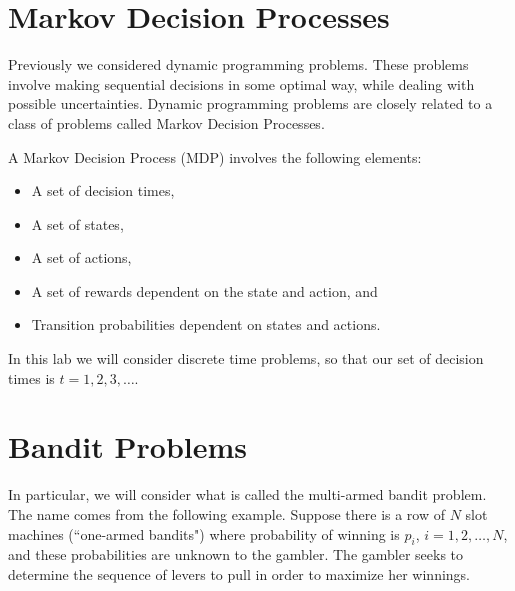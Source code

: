 
\section*{Markov Decision Processes}
Previously we considered dynamic programming problems.
These problems involve making sequential decisions in some optimal way,
while dealing with possible uncertainties.  Dynamic programming problems are closely
related to a class of problems called Markov Decision Processes.

A Markov Decision Process (MDP) involves the following elements:

\begin{itemize}
\item   A set of decision times,
\item   A set of states,
\item   A set of actions,
\item   A set of rewards dependent on the state and action, and
\item   Transition probabilities dependent on states and actions.
\end{itemize}
In this lab we will consider discrete time problems, so that our
set of decision times is $t = 1,2,3,\ldots$.

\section*{Bandit Problems}
In particular, we will consider what is called the multi-armed bandit
problem.  The name comes from the following example.
Suppose there is a row of $N$ slot machines (``one-armed bandits")
where probability of winning is $p_i$, $i= 1,2,\ldots,N$,
and these probabilities are unknown to the gambler.
The gambler seeks to determine the sequence of levers to pull in
order to maximize her winnings.


